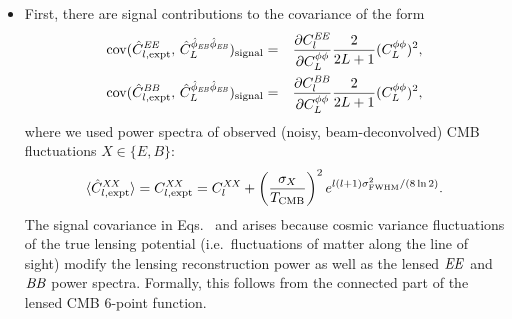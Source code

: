 \begin{itemize}
\item First, there are signal contributions to the covariance of the form
\begin{eqnarray}
  \label{eq:covEEphiEBphiEB}
  \mathrm{cov}(\hat C^{\mathit{EE}}_{l,\mathrm{expt}},\, 
  \hat{C}^{\hat\phi_{\mathit{EB}}\hat\phi_{\mathit{EB}}}_{L})_\mathrm{signal}
&=&
\frac{\partial C^{\mathit{EE}}_l}{\partial C^{\phi\phi}_{L}}
\frac{2}{2L+1} (C^{\phi\phi}_{L})^2,\\
  \label{eq:covBBphiEBphiEB}
  \mathrm{cov}(\hat C^{\mathit{BB}}_{l,\mathrm{expt}},\, 
  \hat{C}^{\hat\phi_{\mathit{EB}}\hat\phi_{\mathit{EB}}}_{L})_\mathrm{signal}
&=&
\frac{\partial C^{\mathit{BB}}_l}{\partial C^{\phi\phi}_{L}}
\frac{2}{2L+1} (C^{\phi\phi}_{L})^2,
\end{eqnarray}
where we used power spectra of observed (noisy, beam-deconvolved) CMB fluctuations $X\in \{E,B\}$:
\begin{equation}
  \label{eq:CXXexptExpectation}
  \langle\hat C^{\mathit{XX}}_{l,\mathrm{expt}}\rangle = 
 C^{\mathit{XX}}_{l,\mathrm{expt}} = C^{\mathit{XX}}_{l}
+ \left(\frac{\sigma_X}{T_\mathrm{CMB}}\right)^2 
  e^{l(l+1)\sigma^2_{\mathrm{FWHM}}/(8\ln 2)}.
\end{equation}
The signal covariance in Eqs.~ and  arises because cosmic variance fluctuations of the true lensing potential (i.e.~fluctuations of matter along the line of sight) modify the lensing reconstruction power as well as the lensed $\mathit{EE}$ and $\mathit{BB}$ power spectra.  Formally, this follows from the connected part of the lensed CMB 6-point function.


\end{itemize}
